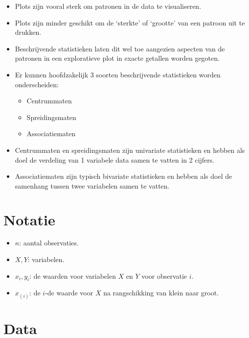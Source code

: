 \documentclass[]{memoir}
\providecommand{\tightlist}{%
  \setlength{\itemsep}{0pt}\setlength{\parskip}{0pt}}
\begin{document}
\begin{itemize}
\tightlist
\item
  Plots zijn vooral sterk om patronen in de data te visualiseren.
\item
  Plots zijn minder geschikt om de `sterkte' of `grootte' van een
  patroon uit te drukken.
\item
  Beschrijvende statistieken laten dit wel toe aangezien aspecten van de
  patronen in een exploratieve plot in exacte getallen worden gegoten.
\item
  Er kunnen hoofdzakelijk 3 soorten beschrijvende statistieken worden
  onderscheiden:

  \begin{itemize}
  \tightlist
  \item
    Centrummaten
  \item
    Spreidingsmaten
  \item
    Associatiematen
  \end{itemize}
\item
  Centrummaten en spreidingsmaten zijn univariate statistieken en hebben
  als doel de verdeling van 1 variabele data samen te vatten in 2
  cijfers.
\item
  Associatiematen zijn typisch bivariate statistieken en hebben als doel
  de samenhang tussen twee variabelen samen te vatten.
\end{itemize}

\section{Notatie}\label{notatie}

\begin{itemize}
\tightlist
\item
  \(n\): aantal observaties.
\item
  \(X, Y\): variabelen.
\item
  \(x_i, y_i\): de waarden voor variabelen \(X\) en \(Y\) voor
  observatie \(i\).
\item
  \(x_{(i)}\): de \(i\)-de waarde voor \(X\) na rangschikking van klein
  naar groot.
\end{itemize}

\section{Data}\label{data-1}
\end{document}
